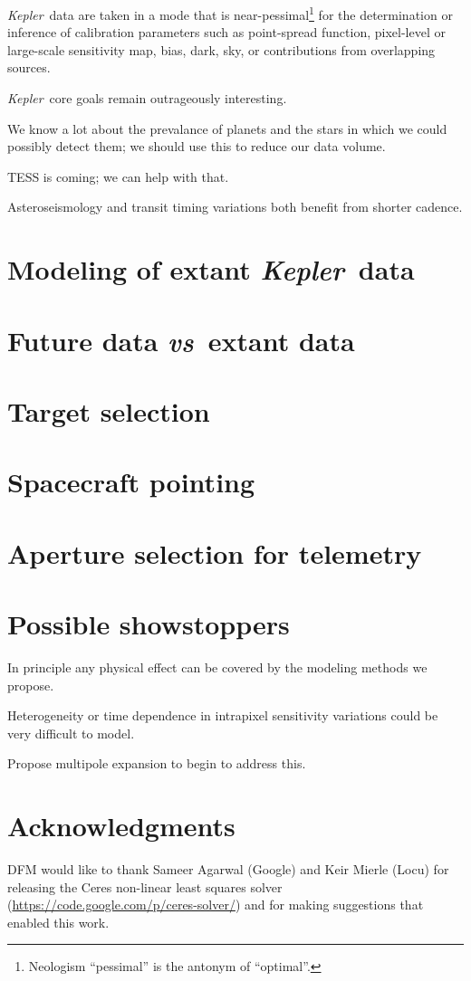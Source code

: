 \documentclass[12pt]{article}
\newcommand{\foreign}[1]{\textit{#1}}
\newcommand{\vs}{\foreign{vs}}
\newcommand{\observatory}[1]{\textsl{#1}}
\newcommand{\kepler}{\observatory{Kepler}}
\newcommand{\Kepler}{\kepler}
\begin{document}
\Kepler\ data are taken in a mode that is
near-pessimal\footnote{Neologism ``pessimal'' is the antonym of
  ``optimal''.} for the determination or inference of calibration
parameters such as point-spread function, pixel-level or large-scale
sensitivity map, bias, dark, sky, or contributions from overlapping
sources.

\Kepler\ core goals remain outrageously interesting.

We know a lot about the prevalance of planets and the stars in which
we could possibly detect them; we should use this to reduce our data
volume.

TESS is coming; we can help with that.

Asteroseismology and transit timing variations both benefit from
shorter cadence.

\section{Modeling of extant \Kepler\ data}\label{sec:extant}

\section{Future data \vs\ extant data}\label{sec:future}

\section{Target selection}\label{sec:target}

\section{Spacecraft pointing}\label{sec:pointing}

\section{Aperture selection for telemetry}\label{sec:telemetry}

\section{Possible showstoppers}\label{sec:stop}

In principle any physical effect can be covered by the modeling
methods we propose.

Heterogeneity or time dependence in intrapixel sensitivity variations
could be very difficult to model.

Propose multipole expansion to begin to address this.

\section{Acknowledgments}

DFM would like to thank Sameer Agarwal (Google) and Keir Mierle (Locu) for
releasing the Ceres non-linear least squares solver
(\url{https://code.google.com/p/ceres-solver/}) and for making suggestions
that enabled this work.
\end{document}
